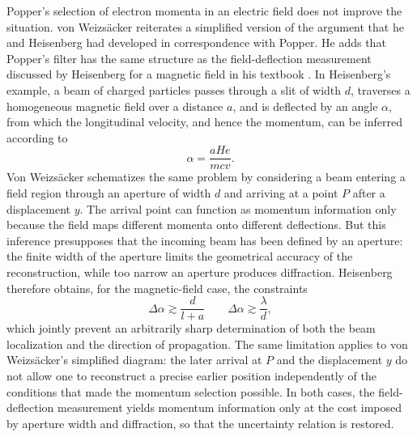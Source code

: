 \documentclass[final,12pt]{article}
\newcommand{\vW}{von Weizsäcker\xspace}
\newcommand{\VW}{Von Weizsäcker\xspace}
\begin{document}
Popper's selection of electron momenta in an electric field does not improve the situation. \vW reiterates a simplified version of the argument that he and Heisenberg had developed in correspondence with Popper. He adds that Popper's filter has the same structure as the field-deflection measurement discussed by Heisenberg for a magnetic field in his textbook \citep[21--22]{Heisenberg1930}. In Heisenberg's example, a beam of charged particles passes through a slit of width $d$, traverses a homogeneous magnetic field over a distance $a$, and is deflected by an angle $\alpha$, from which the longitudinal velocity, and hence the momentum, can be inferred according to
\begin{equation*}
\alpha=\frac{aHe}{mcv}.
\end{equation*}
%
\VW schematizes the same problem by considering a beam entering a field region through an aperture of width $d$ and arriving at a point $P$ after a displacement $y$. The arrival point can function as momentum information only because the field maps different momenta onto different deflections. But this inference presupposes that the incoming beam has been defined by an aperture: the finite width of the aperture limits the geometrical accuracy of the reconstruction, while too narrow an aperture produces diffraction. Heisenberg therefore obtains, for the magnetic-field case, the constraints
\begin{equation*}
\Delta \alpha \gtrsim \frac{d}{l+a} \quad \quad \Delta \alpha \gtrsim \frac{\lambda}{d},
\end{equation*}
%
which jointly prevent an arbitrarily sharp determination of both the beam localization and the direction of propagation. The same limitation applies to \vW's simplified diagram: the later arrival at $P$ and the displacement $y$ do not allow one to reconstruct a precise earlier position independently of the conditions that made the momentum selection possible. In both cases, the field-deflection measurement yields momentum information only at the cost imposed by aperture width and diffraction, so that the uncertainty relation is restored.
\end{document}

